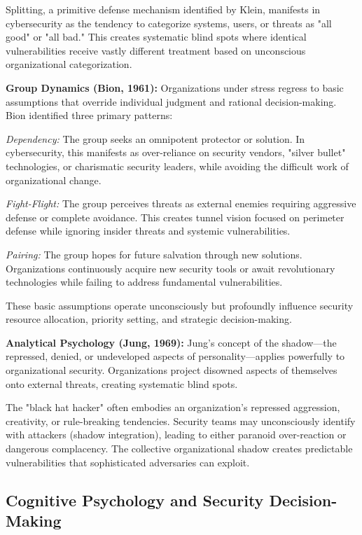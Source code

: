 \documentclass[10pt, twocolumn]{article}
\begin{document}
Splitting, a primitive defense mechanism identified by Klein, manifests in cybersecurity as the tendency to categorize systems, users, or threats as "all good" or "all bad." This creates systematic blind spots where identical vulnerabilities receive vastly different treatment based on unconscious organizational categorization.

\textbf{Group Dynamics (Bion, 1961):} Organizations under stress regress to basic assumptions that override individual judgment and rational decision-making. Bion identified three primary patterns:

\textit{Dependency:} The group seeks an omnipotent protector or solution. In cybersecurity, this manifests as over-reliance on security vendors, "silver bullet" technologies, or charismatic security leaders, while avoiding the difficult work of organizational change.

\textit{Fight-Flight:} The group perceives threats as external enemies requiring aggressive defense or complete avoidance. This creates tunnel vision focused on perimeter defense while ignoring insider threats and systemic vulnerabilities.

\textit{Pairing:} The group hopes for future salvation through new solutions. Organizations continuously acquire new security tools or await revolutionary technologies while failing to address fundamental vulnerabilities.

These basic assumptions operate unconsciously but profoundly influence security resource allocation, priority setting, and strategic decision-making.

\textbf{Analytical Psychology (Jung, 1969):} Jung's concept of the shadow—the repressed, denied, or undeveloped aspects of personality—applies powerfully to organizational security. Organizations project disowned aspects of themselves onto external threats, creating systematic blind spots.

The "black hat hacker" often embodies an organization's repressed aggression, creativity, or rule-breaking tendencies. Security teams may unconsciously identify with attackers (shadow integration), leading to either paranoid over-reaction or dangerous complacency. The collective organizational shadow creates predictable vulnerabilities that sophisticated adversaries can exploit.

\subsection{Cognitive Psychology and Security Decision-Making}
\end{document}
